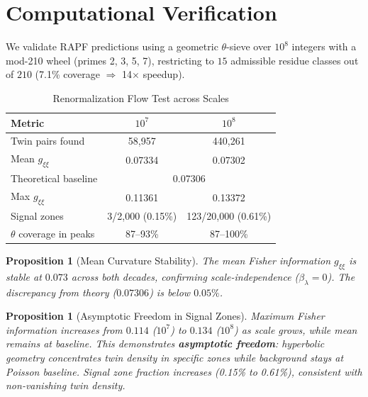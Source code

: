 \documentclass[12pt]{article}
\newtheorem{proposition}[theorem]{Proposition}
\begin{document}
\section{Computational Verification}
\label{sec:computation}

We validate RAPF predictions using a geometric $\theta$-sieve over $10^8$
integers with a mod-210 wheel (primes 2, 3, 5, 7), restricting to $15$
admissible residue classes out of $210$ (7.1\% coverage $\Rightarrow$ 14$\times$ speedup).

\begin{table}[htbp]
\centering
\caption{Renormalization Flow Test across Scales}
\label{tab:renormalization}
\begin{tabular}{lcc}
\hline
\textbf{Metric} & \textbf{$10^7$} & \textbf{$10^8$} \\
\hline
Twin pairs found & 58,957 & 440,261 \\
Mean $g_{\xi\xi}$ & 0.07334 & 0.07302 \\
Theoretical baseline & \multicolumn{2}{c}{0.07306} \\
Max $g_{\xi\xi}$ & 0.11361 & 0.13372 \\
Signal zones & 3/2,000 (0.15\%) & 123/20,000 (0.61\%) \\
$\theta$ coverage in peaks & 87--93\% & 87--100\% \\
\hline
\end{tabular}
\end{table}

\begin{proposition}[Mean Curvature Stability]
The mean Fisher information $g_{\xi\xi}$ is stable at $0.073$ across both
decades, confirming scale-independence ($\beta_\lambda = 0$). The discrepancy
from theory ($0.07306$) is below $0.05\%$.
\end{proposition}

\begin{proposition}[Asymptotic Freedom in Signal Zones]
Maximum Fisher information increases from $0.114$ ($10^7$) to $0.134$ ($10^8$)
as scale grows, while mean remains at baseline. This demonstrates
\textbf{asymptotic freedom}: hyperbolic geometry concentrates twin density in
specific zones while background stays at Poisson baseline. Signal zone fraction
increases (0.15\% to 0.61\%), consistent with non-vanishing twin density.
\end{proposition}
\end{document}
